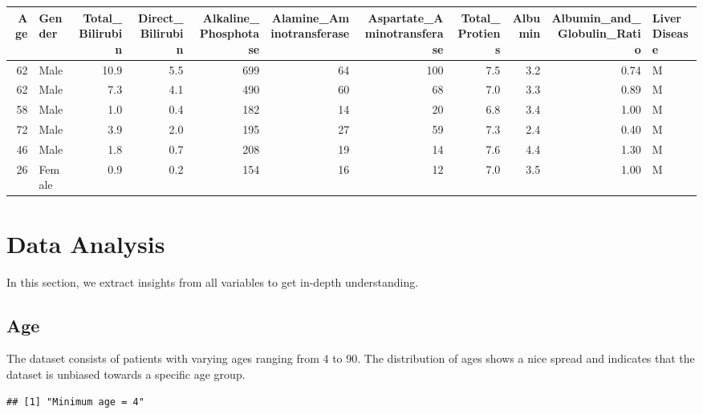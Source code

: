 \documentclass[]{article}
\newenvironment{Shaded}{\begin{snugshade}}{\end{snugshade}}
\newcommand{\KeywordTok}[1]{\textcolor[rgb]{0.13,0.29,0.53}{\textbf{#1}}}
\newcommand{\NormalTok}[1]{#1}
\newcommand{\OperatorTok}[1]{\textcolor[rgb]{0.81,0.36,0.00}{\textbf{#1}}}
\newcommand{\StringTok}[1]{\textcolor[rgb]{0.31,0.60,0.02}{#1}}
\begin{document}
\begin{longtable}[]{@{}rlrrrrrrrrl@{}}
\toprule
Age & Gender & Total\_Bilirubin & Direct\_Bilirubin &
Alkaline\_Phosphotase & Alamine\_Aminotransferase &
Aspartate\_Aminotransferase & Total\_Protiens & Albumin &
Albumin\_and\_Globulin\_Ratio & LiverDisease\tabularnewline
\midrule
\endhead
62 & Male & 10.9 & 5.5 & 699 & 64 & 100 & 7.5 & 3.2 & 0.74 &
M\tabularnewline
62 & Male & 7.3 & 4.1 & 490 & 60 & 68 & 7.0 & 3.3 & 0.89 &
M\tabularnewline
58 & Male & 1.0 & 0.4 & 182 & 14 & 20 & 6.8 & 3.4 & 1.00 &
M\tabularnewline
72 & Male & 3.9 & 2.0 & 195 & 27 & 59 & 7.3 & 2.4 & 0.40 &
M\tabularnewline
46 & Male & 1.8 & 0.7 & 208 & 19 & 14 & 7.6 & 4.4 & 1.30 &
M\tabularnewline
26 & Female & 0.9 & 0.2 & 154 & 16 & 12 & 7.0 & 3.5 & 1.00 &
M\tabularnewline
\bottomrule
\end{longtable}

\section{Data Analysis}
\label{sec:dataanalysis}

In this section, we extract insights from all variables to get in-depth
understanding.

\subsection{Age}

The dataset consists of patients with varying ages ranging from 4 to 90.
The distribution of ages shows a nice spread and indicates that the
dataset is unbiased towards a specific age group.

\begin{Shaded}
\end{Shaded}

\begin{verbatim}
## [1] "Minimum age = 4"
\end{verbatim}

\begin{Shaded}
\end{Shaded}
\end{document}
